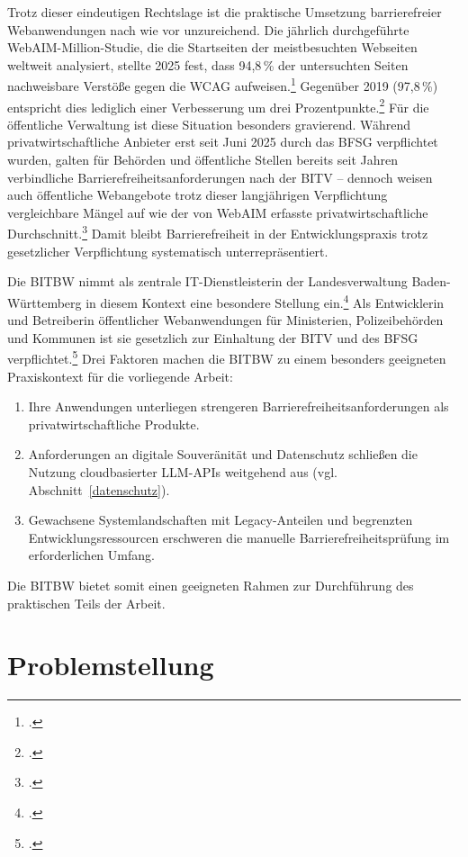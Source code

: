 Trotz dieser eindeutigen Rechtslage ist die praktische Umsetzung barrierefreier Webanwendungen nach wie vor unzureichend. Die jährlich durchgeführte WebAIM-Million-Studie, die die Startseiten der meistbesuchten Webseiten weltweit analysiert, stellte 2025 fest, dass 94{,}8\,\% der untersuchten Seiten nachweisbare Verstöße gegen die \ac{WCAG} aufweisen.\footcite[Vgl.][]{WebAIM} Gegenüber 2019 (97{,}8\,\%) entspricht dies lediglich einer Verbesserung um drei Prozentpunkte.\footcite[Vgl.][]{WebAIM19} Für die öffentliche Verwaltung ist diese Situation besonders gravierend. Während privatwirtschaftliche Anbieter erst seit Juni 2025 durch das \ac{BFSG} verpflichtet wurden, galten für Behörden und öffentliche Stellen bereits seit Jahren verbindliche Barrierefreiheitsanforderungen nach der \ac{BITV} -- dennoch weisen auch öffentliche Webangebote trotz dieser langjährigen Verpflichtung vergleichbare Mängel auf wie der von WebAIM erfasste privatwirtschaftliche Durchschnitt.\footcite[Vgl.][S. 281, 469--488]{heinemann_barrierefreiheit_2024} Damit bleibt Barrierefreiheit in der Entwicklungspraxis trotz gesetzlicher Verpflichtung systematisch unterrepräsentiert.

Die \ac{BITBW} nimmt als zentrale IT-Dienstleisterin der Landesverwaltung Baden-Württemberg in diesem Kontext eine besondere Stellung ein.\footcite[Vgl.][]{BITBW_2021} Als Entwicklerin und Betreiberin öffentlicher Webanwendungen für Ministerien, Polizeibehörden und Kommunen ist sie gesetzlich zur Einhaltung der \ac{BITV} und des \ac{BFSG} verpflichtet.\footcite[Vgl.][]{Landesrecht_BW} Drei Faktoren machen die \ac{BITBW} zu einem besonders geeigneten Praxiskontext für die vorliegende Arbeit:
\begin{enumerate}
    \item Ihre Anwendungen unterliegen strengeren Barrierefreiheitsanforderungen als privatwirtschaftliche Produkte.
    \item Anforderungen an digitale Souveränität und Datenschutz schließen die Nutzung cloudbasierter \acs{LLM}-\acs{API}s weitgehend aus (vgl. Abschnitt~\ref{datenschutz}).
    \item Gewachsene Systemlandschaften mit Legacy-Anteilen und begrenzten Entwicklungs\-ressourcen erschweren die manuelle Barrierefreiheitsprüfung im erforderlichen Umfang.
\end{enumerate}
Die \ac{BITBW} bietet somit einen geeigneten Rahmen zur Durchführung des praktischen Teils der Arbeit.

\section{Problemstellung}\label{kap:1.2}

